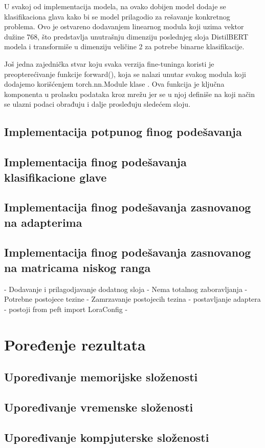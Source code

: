 \documentclass[12pt,oneside]{memoir}
\begin{document}
U svakoj od implementacija modela, na ovako dobijen model dodaje se klasifikaciona glava kako bi se model prilagodio za rešavanje konkretnog problema. Ovo je ostvareno dodavanjem linearnog modula koji uzima vektor dužine 768, što predstavlja unutrašnju dimenziju poslednjeg sloja DistilBERT modela i transformiše u dimenziju veličine 2 za potrebe binarne klasifikacije. 

Još jedna zajednička stvar koju svaka verzija fine-tuninga koristi je preopterećivanje funkcije forward(), koja se nalazi unutar svakog modula koji dodajemo korišćenjem torch.nn.Module klase \cite{pytorch_nn_module}. Ova funkcija je ključna komponenta u prolasku podataka kroz mrežu jer se u njoj definiše na koji način se ulazni podaci obrađuju i dalje prosleđuju sledećem sloju.  

\section{Implementacija potpunog finog podešavanja}
\section{Implementacija finog podešavanja klasifikacione glave}
\section{Implementacija finog podešavanja zasnovanog na adapterima}
\section{Implementacija finog podešavanja zasnovanog na matricama niskog ranga}
- Dodavanje i prilagodjavanje dodatnog sloja
- Nema totalnog zaboravljanja
- Potrebne postojece tezine
- Zamrzavanje postojecih tezina
- postavljanje adaptera
- postoji from peft import LoraConfig
- 


\chapter{Poređenje rezultata}
\section{Upoređivanje memorijske složenosti}
\section{Upoređivanje vremenske složenosti}
\section{Upoređivanje kompjuterske složenosti}
\end{document}
